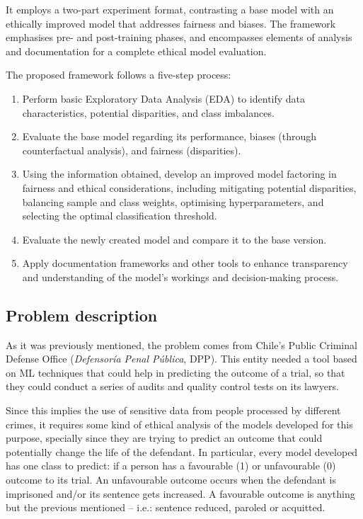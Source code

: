 \documentclass[twoside,11pt]{article}
\begin{document}
It employs a two-part experiment format, contrasting a base model with an ethically improved model that addresses fairness and biases. The framework emphasises pre- and post-training phases, and encompasses elements of analysis and documentation for a complete ethical model evaluation.

The proposed framework follows a five-step process:

\begin{enumerate}
    \item Perform basic Exploratory Data Analysis (EDA) to identify data characteristics, potential disparities, and class imbalances.
    \item Evaluate the base model regarding its performance, biases (through counterfactual analysis), and fairness (disparities).
    \item Using the information obtained, develop an improved model factoring in fairness and ethical considerations, including mitigating potential disparities, balancing sample and class weights, optimising hyperparameters, and selecting the optimal classification threshold.
    \item Evaluate the newly created model and compare it to the base version.
    \item Apply documentation frameworks and other tools to enhance transparency and understanding of the model's workings and decision-making process.
\end{enumerate}

\subsection{Problem description}

As it was previously mentioned, the problem comes from Chile's Public Criminal Defense Office (\textit{Defensoría Penal Pública}, DPP). This entity needed a tool based on ML techniques that could help in predicting the outcome of a trial, so that they could conduct a series of audits and quality control tests on its lawyers. 

Since this implies the use of sensitive data from people processed by different crimes, it requires some kind of ethical analysis of the models developed for this purpose, specially since they are trying to predict an outcome that could potentially change the life of the defendant. In particular, every model developed has one class to predict: if a person has a favourable (1) or unfavourable (0) outcome to its trial. An unfavourable outcome occurs when the defendant is imprisoned and/or its sentence gets increased. A favourable outcome is anything but the previous mentioned -- i.e.: sentence reduced, paroled or acquitted. 
\end{document}
